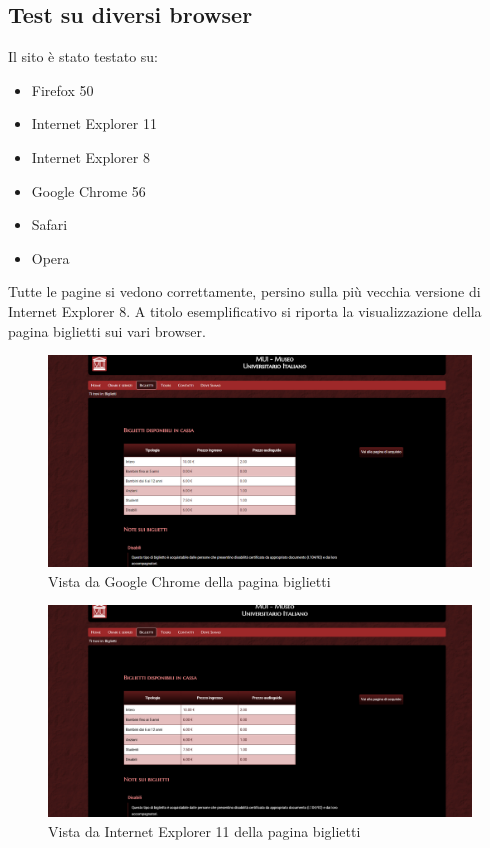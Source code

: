 \documentclass[10pt,a4paper,onecolumn]{article}
\begin{document}
\subsection{Test su diversi browser}
Il sito è stato testato su:
\begin{itemize}
\item Firefox 50
\item Internet Explorer 11
\item Internet Explorer 8
\item Google Chrome 56
\item Safari
\item Opera
\end{itemize}
Tutte le pagine si vedono correttamente, persino sulla più vecchia versione di Internet Explorer 8. A titolo esemplificativo si riporta la visualizzazione della pagina biglietti sui vari browser.

\begin{figure}[H]
    \centering
    \includegraphics[scale=0.10]{biglietti_chrome.png}
    \caption{Vista da Google Chrome della pagina biglietti}
\end{figure}

\begin{figure}[H]
    \centering
    \includegraphics[scale=0.10]{biglietti_explorer11.png}
    \caption{Vista da Internet Explorer 11 della pagina biglietti}
\end{figure}
\end{document}
